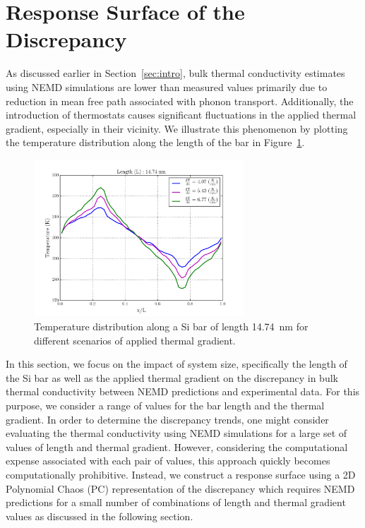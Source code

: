 \section{Response Surface of the Discrepancy}
\label{sec:response}

As discussed earlier in Section~\ref{sec:intro}, bulk thermal conductivity estimates using NEMD simulations
are lower than measured values primarily due to reduction in mean free path associated with phonon transport. 
Additionally, the introduction of thermostats causes significant fluctuations in the applied thermal gradient,
especially in their vicinity. 
We illustrate this phenomenon by plotting the temperature 
distribution along the length of the bar in Figure~\ref{fig:kapitza}. 

\begin{figure}[htbp]
 \begin{center}
  \includegraphics[width=0.70\textwidth]{./Figures/temp_plot}
\caption{Temperature distribution along a Si bar of length 14.74~nm for
different scenarios of applied thermal gradient.}
\label{fig:kapitza}
\end{center}
\end{figure}

In this section, we focus on the impact of
system size, specifically the length of the Si bar as well as the applied thermal gradient on the discrepancy
in bulk thermal conductivity between NEMD predictions and experimental data. For this purpose, we consider
a range of values for the bar length and the thermal gradient. In order to determine the discrepancy trends, one
might consider evaluating the thermal conductivity using NEMD simulations for a large set of values of length and
thermal gradient. However, considering the computational expense associated with each pair of values, this approach quickly
becomes computationally prohibitive. Instead, we construct a response surface using a 2D
Polynomial Chaos (PC) representation of the discrepancy which requires NEMD predictions for a small number of
combinations of length and thermal gradient values as discussed in the following section. 

